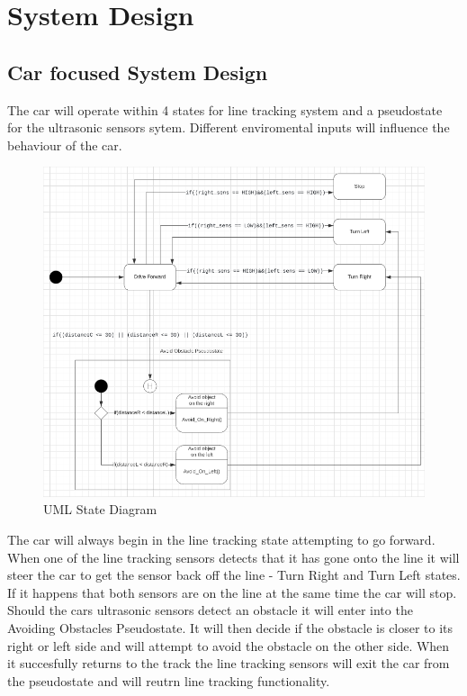 \documentclass[conference]{IEEEtran}
\begin{document}
\section{System Design}
\subsection{Car focused System Design}
The car will operate within 4 states for line tracking system and a pseudostate for the ultrasonic sensors sytem. Different enviromental inputs will influence the behaviour of the car.
\begin{figure}[h!]
	\includegraphics[width=\linewidth]{UMLStateDiagram.png}
	\caption{UML State Diagram}
	\label{fig:UMLSD1}
\end{figure}
The car will always begin in the line tracking state attempting to go forward. When one of the line tracking sensors detects that it has gone onto the line it will steer the car to get the sensor back off the line - Turn Right and Turn Left states. If it happens that both sensors are on the line at the same time the car will stop. Should the cars ultrasonic sensors detect an obstacle it will enter into the Avoiding Obstacles Pseudostate. It will then decide if the obstacle is closer to its right or left side and will attempt to avoid the obstacle on the other side. When it succesfully returns to the track the line tracking sensors will exit the car from the pseudostate and will reutrn line tracking functionality.
\end{document}
